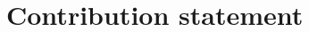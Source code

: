 \documentclass[conference]{IEEEtran}
\begin{document}
\begin{thebibliography}{00}
\end{thebibliography}

\pagebreak
\appendix
\section*{Contribution statement}
\end{document}
